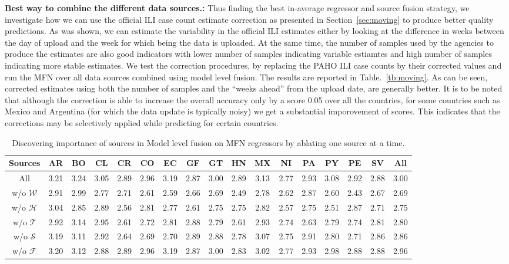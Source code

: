 {\noindent \textbf{Best way to combine the different data sources.: }} Thus finding the 
best in-average regressor and source fusion strategy, we investigate how we can use the 
official ILI case count estimate correction as presented in Section~\ref{sec:moving} to 
produce better quality predictions. As was shown, we can estimate the variability in the 
official ILI estimates either by looking at the difference in weeks between the day of upload 
and the week for which being the data is uploaded. At the same time, the number of samples used 
by the agencies to produce the estimates are also good indicators with lower number of samples
indicating variable estiamtes and high number of samples indicating more stable estimates. 
We test the correction procedures, by replacing the PAHO ILI case counts by their corrected values
and run the MFN over all data sources combined using model level fusion.
The results are reported in Table.~\ref{tb:moving}. As can be seen, corrected estimates 
using both the number of samples and 
the ``weeks ahead'' from the upload date, are generally better. It is to be noted that although
the correction is 
able to increase the overall accuracy only by a score 0.05 over all the countries, 
for some countries such as Mexico and Argentina (for which the data update is typically noisy) we get 
a substantial imporovement of scores. This indicates that the corrections may be selectively applied 
while predicting for certain countries. 


\begin{table*}[tb!]
  \centering
  \caption{\label{tb:Ablation} Discovering importance of sources in Model level fusion on MFN 
  regressors by ablating one source at a time.}
\vspace{1em}
\begin{tabular}{|*{17}{c|}}
\hline
Sources & AR & BO & CL & CR & CO & EC & GF & GT & HN & MX & NI & PA & PY & PE & SV & All\\
\hline 
\hline
All               & 3.21& 3.24& 3.05& 2.89& 2.96& 3.19& 2.87& 3.00& 2.89& 3.13& 2.77& 2.93& 3.08& 2.92& 2.88& 3.00\\
w/o $\mathcal{W}$ & 2.91& 2.99& 2.77& 2.71& 2.61& 2.59& 2.66& 2.69& 2.49& 2.78& 2.62& 2.87& 2.60& 2.43& 2.67& 2.69  \\
w/o $\mathcal{H}$ & 3.04& 2.85& 2.89& 2.56& 2.81& 2.77& 2.61& 2.75& 2.75& 2.82& 2.57& 2.75& 2.51& 2.87& 2.71& 2.75  \\
w/o $\mathcal{T}$ & 2.92& 3.14& 2.95& 2.61& 2.72& 2.81& 2.88& 2.79& 2.61& 2.93& 2.74& 2.63& 2.79& 2.74& 2.81& 2.80  \\
w/o $\mathcal{S}$ & 3.19& 3.11& 2.92& 2.64& 2.69& 2.70& 2.89& 2.88& 2.78& 3.07& 2.75& 2.91& 2.80& 2.71& 2.86& 2.86  \\
w/o $\mathcal{F}$ & 3.20& 3.12& 2.88& 2.89& 2.96& 3.19& 2.87& 3.00& 2.83& 3.02& 2.77& 2.93& 2.98& 2.88& 2.88& 2.96  \\
\hline
\end{tabular}
\end{table*}

